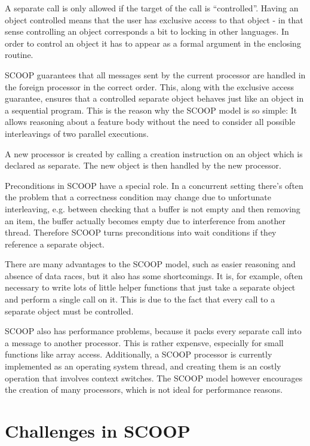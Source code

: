\documentclass[a4paper,10pt]{article}
\begin{document}
A separate call is only allowed if the target of the call is ``controlled''.
Having an object controlled means that the user has exclusive access to that object - in that sense controlling an object corresponds a bit to locking in other languages.
In order to control an object it has to appear as a formal argument in the enclosing routine.

SCOOP guarantees that all messages sent by the current processor are handled in the foreign processor in the correct order.
This, along with the exclusive access guarantee, ensures that a controlled separate object behaves just like an object in a sequential program.
This is the reason why the SCOOP model is so simple: 
It allows reasoning about a feature body without the need to consider all possible interleavings of two parallel executions.

A new processor is created by calling a creation instruction on an object which is declared as separate.
The new object is then handled by the new processor.

Preconditions in SCOOP have a special role.
In a concurrent setting there's often the problem that a correctness condition may change due to unfortunate interleaving, 
e.g. between checking that a buffer is not empty and then removing an item, the buffer actually becomes empty due to interference from another thread.
Therefore SCOOP turns preconditions into wait conditions if they reference a separate object.

There are many advantages to the SCOOP model, such as easier reasoning and absence of data races, but it also has some shortcomings.
It is, for example, often necessary to write lots of little helper functions that just take a separate object and perform a single call on it.
This is due to the fact that every call to a separate object must be controlled.

SCOOP also has performance problems, because it packs every separate call into a message to another processor.
This is rather expensve, especially for small functions like array access.
Additionally, a SCOOP processor is currently implemented as an operating system thread, and creating them is an costly operation that involves context switches.
The SCOOP model however encourages the creation of many processors, which is not ideal for performance reasons.

\section{Challenges in SCOOP}
\label{sec:scoop-challenges}
\end{document}
